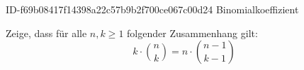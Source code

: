 \begin{exercise}
      {ID-f69b08417f14398a22c57b9b2f700ce067c00d24}
      {Binomialkoeffizient}
  \ifproblem\problem\par
    Zeige, dass für alle $n,k\geq1$ folgender Zusammenhang gilt:
    \begin{equation*}
      k\cdot\binom{n}{k}=n\cdot\binom{n-1}{k-1}
    \end{equation*}
  \fi
\end{exercise}
